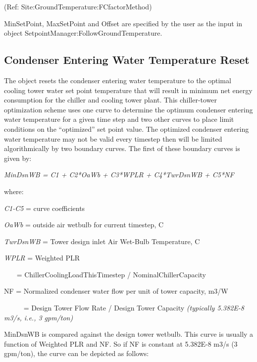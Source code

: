 (Ref: Site:GroundTemperature:FCfactorMethod)

MinSetPoint, MaxSetPoint and Offset are specified by the user as the input in object SetpointManager:FollowGroundTemperature.

\subsection{Condenser Entering Water Temperature Reset}\label{condenser-entering-water-temperature-reset}

The object resets the condenser entering water temperature to the optimal cooling tower water set point temperature that will result in minimum net energy consumption for the chiller and cooling tower plant. This chiller-tower optimization scheme uses one curve to determine the optimum condenser entering water temperature for a given time step and two other curves to place limit conditions on the ``optimized'' set point value. The optimized condenser entering water temperature may not be valid every timestep then will be limited algorithmically by two boundary curves. The first of these boundary curves is given by:

\emph{MinDsnWB = C1 + C2*OaWb + C3*WPLR + C4*TwrDsnWB + C5*NF}

where:

\emph{C1-C5} = curve coefficients

\emph{OaWb} = outside air wetbulb for current timestep, C

\emph{TwrDsnWB} = Tower design inlet Air Wet-Bulb Temperature, C

\emph{WPLR} = Weighted PLR

~~~ = ChillerCoolingLoadThisTimestep / NominalChillerCapacity

NF = Normalized condenser water flow per unit of tower capacity, m3/W

~~~~~ = Design Tower Flow Rate / Design Tower Capacity \emph{(typically 5.382E-8 m3/s, i.e., 3 gpm/ton)}

MinDsnWB is compared against the design tower wetbulb. This curve is usually a function of Weighted PLR and NF. So if NF is constant at 5.382E-8 m3/s (3 gpm/ton), the curve can be depicted as follows:

